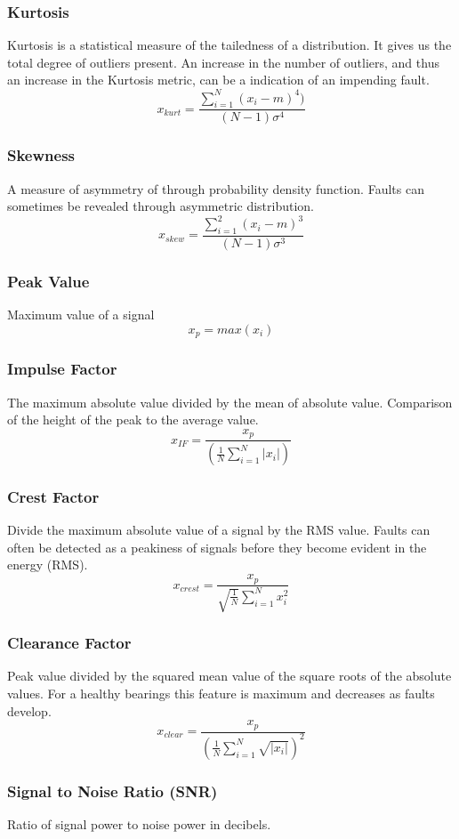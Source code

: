 \documentclass[]{article}
\begin{document}
\subsubsection*{Kurtosis}
Kurtosis is a statistical measure of the tailedness of a distribution. It gives us the total degree of outliers present. An increase in the number of outliers, and thus an increase in the Kurtosis metric, can be a indication of an impending fault.
$$ x_{kurt} = \frac{\sum^N_{i=1}(x_i-m)^4)}{(N-1)\sigma^4} $$ 
\subsubsection*{Skewness} 
A measure of asymmetry of through probability density function. Faults can sometimes be revealed through asymmetric distribution.
$$ x_{skew} = \frac{\sum^2_{i=1}(x_i-m)^3}{(N-1)\sigma^3} $$
\subsubsection*{Peak Value}
Maximum value of a signal
$$ x_p = max(x_i) $$ 
\subsubsection*{Impulse Factor} 
The maximum absolute value divided by the mean of absolute value. Comparison of the height of the peak to the average value.
$$ x_{IF} = \frac{x_p}{(\frac{1}{N}\sum^N_{i=1}|x_i|)} $$  
\subsubsection*{Crest Factor} 
Divide the maximum absolute value of a signal by the \gls{RMS} value.
Faults can often be detected as a peakiness of signals before they become evident in the energy (\gls{RMS}).
$$ x_{crest} = \frac{x_p}{\sqrt{\frac{1}{N}}\sum^N_{i=1}x^2_i} $$
\subsubsection*{Clearance Factor} 
Peak value divided by the squared mean value of the square roots of the absolute values. For a healthy bearings this feature is maximum and decreases as faults develop.
$$ x_{clear} = \frac{x_p}{(\frac{1}{N}\sum^N_{i=1}\sqrt{|x_i|})^2} $$
\subsubsection*{Signal to Noise Ratio (\gls{SNR})}
Ratio of signal power to noise power in decibels.
\end{document}
